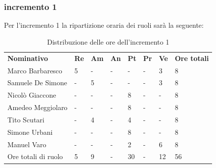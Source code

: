 \subsubsection{incremento 1}
Per l'incremento 1 la ripartizione oraria dei ruoli sarà la seguente:
\begin{center}
    \begin{table}[ht!]
        \centering
        \caption{Distribuzione delle ore dell'incremento 1}
        \vspace{5px}
        \renewcommand{\arraystretch}{1.8}
        \begin{tabular}{p{100px} p{20px} p{20px} p{20px} p{20px} p{20px} p{20px} p{50px} }
            \rowcolor{logo!70} \textbf{Nominativo} & \textbf{Re} & \textbf{Am} & \textbf{An} & \textbf{Pt} & \textbf{Pr} & \textbf{Ve} & \textbf{Ore totali} \\
            Marco Barbaresco                       & 5           & -           & -           & -           & -           & 3           & 8                   \\
            Samuele De Simone                      & -           & 5           & -           & -           & -           & 3           & 8                   \\
            Nicolò Giaccone                        & -           & -           & -           & 8           & -           & -           & 8                   \\
            Amedeo Meggiolaro                      & -           & -           & -           & 8           & -           & -           & 8                   \\
            Tito Scutari                           & -           & 4           & -           & 4           & -           & -           & 8                   \\
            Simone Urbani                          & -           & -           & -           & 8           & -           & -           & 8                   \\
            Manuel Varo                            & -           & -           & -           & 2           & -           & 6           & 8                   \\
            Ore totali di ruolo                    & 5           & 9           & -           & 30          & -           & 12          & 56                  \\
        \end{tabular}
    \end{table}
\end{center}

